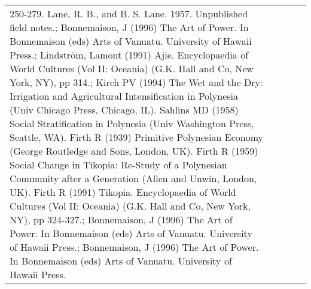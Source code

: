 \begin{longtable}{p{2cm}p{2cm}p{2cm}p{5cm}p{7cm}}
250-279. Lane, R. B., and B. S. Lane. 1957. Unpublished field notes.; Bonnemaison, J (1996) The Art of Power. In Bonnemaison (eds) Arts of Vanuatu. University of Hawaii Press.; Lindström, Lamont (1991) Ajie. Encyclopaedia of World Cultures (Vol II: Oceania) (G.K. Hall and Co, New York, NY), pp 314.; Kirch PV (1994) The Wet and the Dry: Irrigation and Agricultural Intensification in Polynesia (Univ Chicago Press, Chicago, IL). Sahlins MD (1958) Social Stratification in Polynesia (Univ Washington Press, Seattle, WA). Firth R (1939) Primitive Polynesian Economy (George Routledge and Sons, London, UK). Firth R (1959) Social Change in Tikopia: Re-Study of a Polynesian Community after a Generation (Allen and Unwin, London, UK). Firth R (1991) Tikopia. Encyclopaedia of World Cultures (Vol II: Oceania) (G.K. Hall and Co, New York, NY), pp 324-327.; Bonnemaison, J (1996) The Art of Power. In Bonnemaison (eds) Arts of Vanuatu. University of Hawaii Press.; Bonnemaison, J (1996) The Art of Power. In Bonnemaison (eds) Arts of Vanuatu. University of Hawaii Press. \\ 

\end{longtable}
